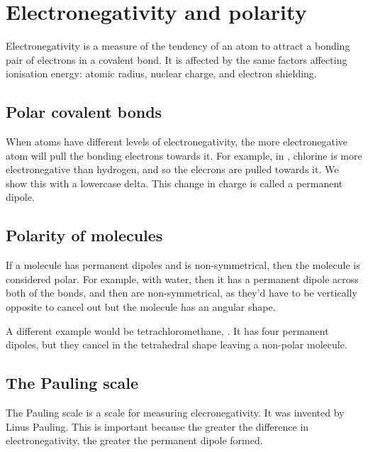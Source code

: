 \section{Electronegativity and polarity}
Electronegativity is a measure of the tendency of an atom to attract a bonding pair of electrons in a covalent bond. It is affected by the same factors affecting ionisation energy: atomic radius, nuclear charge, and electron shielding.

\subsection{Polar covalent bonds}
When atoms have different levels of electronegativity, the more electronegative atom will pull the bonding electrons towards it. For example, in , chlorine is more electronegative than hydrogen, and so the elecrons are pulled towards it. We show this with a lowercase delta. This change in charge is called a permanent dipole.
\begin{center}
\end{center}

\subsection{Polarity of molecules}
If a molecule has permanent dipoles and is non-symmetrical, then the molecule is considered polar. For example, with water, then it has a permanent dipole across both of the bonds, and then are non-symmetrical, as they'd have to be vertically opposite to cancel out but the molecule has an angular shape.
\begin{center}
\end{center}

A different example would be tetrachloromethane, . It has four permanent dipoles, but they cancel in the tetrahedral shape leaving a non-polar molecule.
\begin{center}
\end{center}

\subsection{The Pauling scale}
The Pauling scale is a scale for measuring elecronegativity. It was invented by Linus Pauling. This is important because the greater the difference in electronegativity, the greater the permanent dipole formed.

